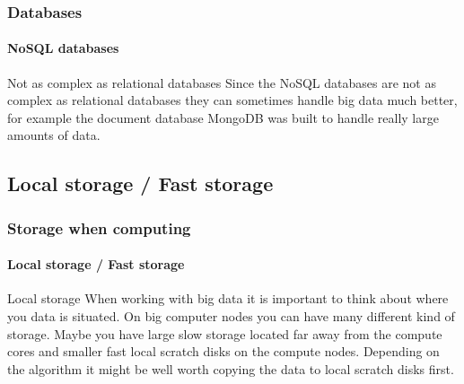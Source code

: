 \documentclass[aspectratio=169,usenames,dvipsnames]{beamer}
\begin{document}
    \begin{frame}
        \frametitle{Databases}
        \framesubtitle{NoSQL databases}
        \begin{block}{Not as complex as relational databases}
            Since the \alert{NoSQL databases} are not as complex as relational
            databases they \alert{can sometimes handle big data much better}, for
            example the document database MongoDB was built to handle really
            large amounts of data.
        \end{block}
    \end{frame}

    \subsection{Local storage / Fast storage}
    \begin{frame}
        \frametitle{Storage when computing}
        \framesubtitle{Local storage / Fast storage}
        \begin{block}{Local storage}
        When working with big data it is important to think about where you
        data is situated. On big computer nodes you can have many different
        kind of storage. Maybe you have large slow storage located far away
        from the compute cores and smaller fast local scratch disks on the
        compute nodes. Depending on the algorithm it \alert{might be well worth
        copying the data to local scratch disks} first.
        \end{block}
    \end{frame}
\end{document}
